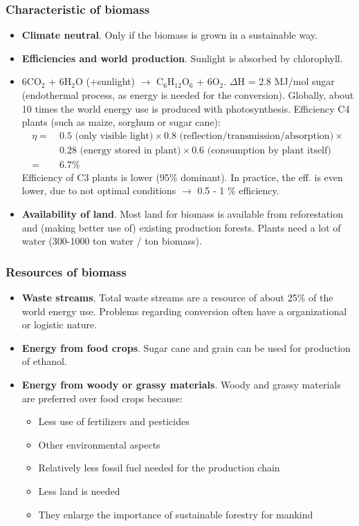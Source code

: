 \documentclass[a4paper,10pt]{article}
\begin{document}
\subsubsection{Characteristic of biomass}
\begin{itemize}
 \item \textbf{Climate neutral}. Only if the biomass is grown in a sustainable way. 
 \item \textbf{Efficiencies and world production}. Sunlight is absorbed by chlorophyll.
 \item 6CO$_2$ + 6H$_2$O (+sunlight) $\rightarrow$ C$_6$H$_{12}$O$_6$ + 6O$_2$. $\Delta$H = 2.8 MJ/mol sugar (endothermal process, as energy is needed for the conversion). Globally, about 10 times the world energy use is produced with photosynthesis. Efficiency C4 plants (such as maize, sorghum or sugar cane):
 \begin{align*}
  \eta =\ & 0.5 \text{ (only visible light)} \times 0.8 \text{ (reflection/transmission/absorption)} \times\\
  & 0.28 \text{ (energy stored in plant)} \times 0.6 \text{ (consumption by plant itself)} \\
  =\ & 6.7\%
 \end{align*}
 Efficiency of C3 plants is lower (95\% dominant). In practice, the eff. is even lower, due to not optimal conditions $\rightarrow$ 0.5 - 1 \% efficiency.
 \item \textbf{Availability of land}. Most land for biomass is available from reforestation and (making better use of) existing production forests. Plants need a lot of water (300-1000 ton water / ton biomass). 
\end{itemize}

\subsubsection{Resources of biomass}
\begin{itemize}
 \item \textbf{Waste streams}. Total waste streams are a resource of about 25\% of the world energy use. Problems regarding conversion often have a organizational or logistic nature. 
 \item \textbf{Energy from food crops}. Sugar cane and grain can be used for production of ethanol. 
 \item \textbf{Energy from woody or grassy materials}. Woody and grassy materials are preferred over food crops because:
 \begin{itemize}
 \item Less use of fertilizers and pesticides
 \item Other environmental aspects
 \item Relatively less fossil fuel needed for the production chain
 \item Less land is needed
 \item They enlarge the importance of sustainable forestry for mankind
 \end{itemize}
\end{itemize}
\end{document}
